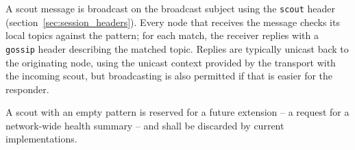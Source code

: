 A scout message is broadcast on the broadcast subject using the
\texttt{scout} header (section~\ref{sec:session_headers}).
Every node that receives the message checks its local topics against the
pattern; for each match, the receiver replies with a \texttt{gossip} header
describing the matched topic. Replies are typically unicast back to the
originating node, using the unicast context provided by the transport with the
incoming scout, but broadcasting is also permitted if that is easier for the
responder.

A scout with an empty pattern is reserved for a future extension -- a request
for a network-wide health summary -- and shall be discarded by current
implementations.
